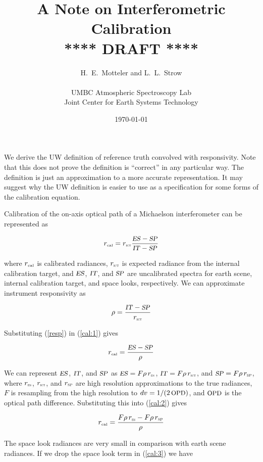 \documentclass[12pt]{article}
\title{A Note on Interferometric Calibration \\
\vspace{3mm}
{****} DRAFT {****} \\
}
\author{H.~E.~Motteler and L.~L.~Strow \\
  \\
  UMBC Atmospheric Spectroscopy Lab \\
  Joint Center for Earth Systems Technology \\
}
\date{\today}
\begin{document}
\maketitle

We derive the UW definition of reference truth convolved with
responsivity.  Note that this does not prove the definition is
``correct'' in any particular way.  The definition is just an
approximation to a more accurate representation.  It may suggest why
the UW definition is easier to use as a specification for some forms
of the calibration equation.

\vspace{2mm}
Calibration of the on-axis optical path of a Michaelson
interferometer can be represented as

\begin{equation}\label{cal:1}
  r_{\mbox{\tiny cal}} = r_{\mbox{\tiny\textsc{ict}}}  \frac{\mbox{\textsl{\small ES}} - \mbox{\textsl{\small SP}}}{\mbox{\textsl{\small IT}} - \mbox{\textsl{\small SP}}}
\end{equation} 

\noindent
where $r_{\mbox{\tiny cal}}$ is calibrated radiances, $r_{\mbox{\tiny\textsc{ict}}}$ is expected radiance
from the internal calibration target, and $\mbox{\textsl{\small ES}}$, $\mbox{\textsl{\small IT}}$, and $\mbox{\textsl{\small SP}}$
are uncalibrated spectra for earth scene, internal calibration
target, and space looks, respectively.  We can approximate
instrument responsivity as

\begin{equation}\label{resp}
  \rho = \frac{\mbox{\textsl{\small IT}} - \mbox{\textsl{\small SP}}}{r_{\mbox{\tiny\textsc{ict}}}}
\end{equation} 

\noindent
Substituting (\ref{resp}) in (\ref{cal:1}) gives

\begin{equation}\label{cal:2}
  r_{\mbox{\tiny cal}} =\frac{\mbox{\textsl{\small ES}} - \mbox{\textsl{\small SP}}}{\rho}
\end{equation} 

We can represent $\mbox{\textsl{\small ES}}$, $\mbox{\textsl{\small IT}}$, and $\mbox{\textsl{\small SP}}$ as $\mbox{\textsl{\small ES}} = F \rho \, r_{\mbox{\tiny\textsc{es}}}$,
$\mbox{\textsl{\small IT}} = F \rho \, r_{\mbox{\tiny\textsc{ict}}}$, and $\mbox{\textsl{\small SP}}= F \rho \, r_{\mbox{\tiny\textsc{SP}}}$, where $r_{\mbox{\tiny\textsc{es}}}$,
$r_{\mbox{\tiny\textsc{ict}}}$, and $r_{\mbox{\tiny\textsc{SP}}}$ are high resolution approximations to the true
radiances, $F$ is resampling from the high resolution to $dv = 1/
(2\, \mbox{\small OPD})$, and $\mbox{\small OPD}$ is the optical path difference.
Substituting this into (\ref{cal:2}) gives

\begin{equation}\label{cal:3}
  r_{\mbox{\tiny cal}} = \frac{F\rho \, r_{\mbox{\tiny\textsc{es}}} - F\rho \, r_{\mbox{\tiny\textsc{SP}}}}{\rho}
\end{equation} 

\noindent
The space look radiances are very small in comparison with earth
scene radiances.  If we drop the space look term in (\ref{cal:3}) 
we have
\end{document}
